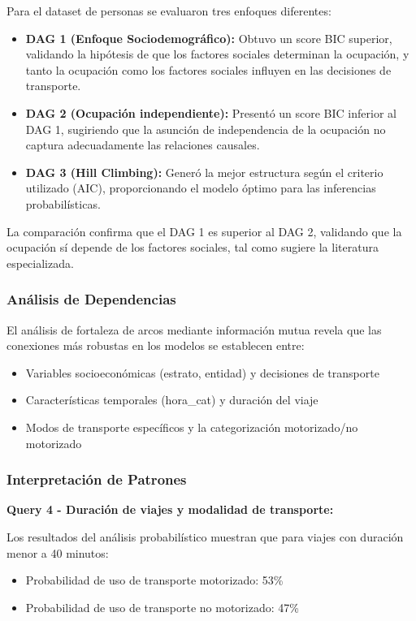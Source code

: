 \documentclass[12pt,a4paper]{article}
\begin{document}
Para el dataset de personas se evaluaron tres enfoques diferentes:
\begin{itemize}
    \item \textbf{DAG 1 (Enfoque Sociodemográfico):} Obtuvo un score BIC superior, validando la hipótesis de que los factores sociales determinan la ocupación, y tanto la ocupación como los factores sociales influyen en las decisiones de transporte.
    \item \textbf{DAG 2 (Ocupación independiente):} Presentó un score BIC inferior al DAG 1, sugiriendo que la asunción de independencia de la ocupación no captura adecuadamente las relaciones causales.
    \item \textbf{DAG 3 (Hill Climbing):} Generó la mejor estructura según el criterio utilizado (AIC), proporcionando el modelo óptimo para las inferencias probabilísticas.
\end{itemize}

La comparación confirma que el DAG 1 es superior al DAG 2, validando que la ocupación sí depende de los factores sociales, tal como sugiere la literatura especializada.

\subsubsection{Análisis de Dependencias}

El análisis de fortaleza de arcos mediante información mutua revela que las conexiones más robustas en los modelos se establecen entre:
\begin{itemize}
    \item Variables socioeconómicas (estrato, entidad) y decisiones de transporte
    \item Características temporales (hora\_cat) y duración del viaje
    \item Modos de transporte específicos y la categorización motorizado/no motorizado
\end{itemize}

\subsubsection{Interpretación de Patrones}

\textbf{Query 4 - Duración de viajes y modalidad de transporte:}

Los resultados del análisis probabilístico muestran que para viajes con duración menor a 40 minutos:
\begin{itemize}
    \item Probabilidad de uso de transporte motorizado: 53\%
    \item Probabilidad de uso de transporte no motorizado: 47\%
\end{itemize}
\end{document}

